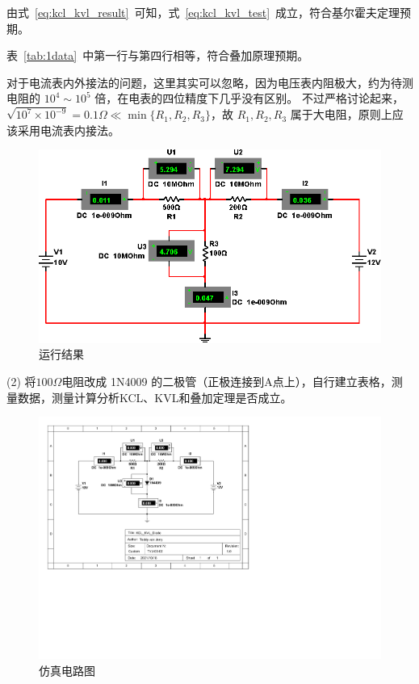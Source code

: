 \documentclass[12pt]{SEU-Circuit-Report}
\begin{document}
            由式~\eqref{eq:kcl_kvl_result}~可知，式~\eqref{eq:kcl_kvl_test}~成立，符合基尔霍夫定理预期。

            表~\ref{tab:1data}~中第一行与第四行相等，符合叠加原理预期。

            对于电流表内外接法的问题，这里其实可以忽略，因为电压表内阻极大，约为待测电阻的 $10^4\sim10^5$ 倍，在电表的四位精度下几乎没有区别。
            不过严格讨论起来，$\sqrt{10^7\times 10^{-9}}=0.1\Omega\ll \min\{R_1,R_2,R_3\}$，故 $R_1,R_2,R_3$ 属于大电阻，原则上应该采用电流表内接法。
            
            \emptyline
            \expsimulate

            \begin{figure}[htbp]
                \centering
                \includegraphics[width=.8\linewidth]{fig/exp1_result.eps}
                \caption{运行结果}
                \label{fig:1result}
            \end{figure}

            \newpage

            (2) 将$100\Omega$电阻改成 1N4009 的二极管（正极连接到A点上），自行建立表格，测量数据，测量计算分析KCL、KVL和叠加定理是否成立。
            \begin{figure}[htbp]
                \centering
                \includegraphics[width=.8\linewidth]{KCL_KVL_Diode.pdf}
                \caption{仿真电路图}
                \label{fig:2circuit}
            \end{figure}
\end{document}
